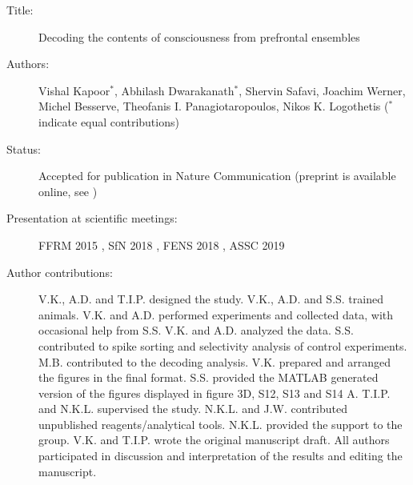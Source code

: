 \begin{description}
\item[Title:]
  Decoding the contents of consciousness from prefrontal ensembles
\item[Authors:]
  Vishal Kapoor$^*$,
  Abhilash Dwarakanath$^*$,
  Shervin Safavi,
  Joachim Werner,
  Michel Besserve,
  Theofanis I. Panagiotaropoulos,
  Nikos K. Logothetis
  ($^*$ indicate equal contributions) 
\item[Status:]
  Accepted for publication in Nature Communication (preprint is available online, see \citet{kapoorDecodingInternallyGenerated2022})
\item[Presentation at scientific meetings:]
  FFRM 2015 \cite{antoniouPerceptualModulationPupillary2015a},
  SfN 2018 \cite{panagiotaropoulosModulationNeuralDischarges2018a},
  FENS 2018 \cite{kapoorSpikingActivityPrefrontal2018},
  ASSC 2019 \cite{kapoorNeuronalDischargesPrefrontal2019}
\item[Author contributions: ]
  V.K., A.D. and T.I.P. designed the study. V.K., A.D. and S.S. trained animals. V.K. and A.D.
  performed experiments and collected data, with occasional help from S.S. V.K. and A.D.
  analyzed the data. S.S. contributed to spike sorting and selectivity analysis of control
  experiments. M.B. contributed to the decoding analysis. V.K. prepared and arranged the figures
  in the final format. S.S. provided the MATLAB generated version of the figures displayed in
  figure 3D, S12, S13 and S14 A. T.I.P. and N.K.L. supervised the study. N.K.L. and J.W.
  contributed unpublished reagents/analytical tools. N.K.L. provided the support to the group. V.K.
  and T.I.P. wrote the original manuscript draft. All authors participated in discussion and
  interpretation of the results and editing the manuscript.
\end{description}

